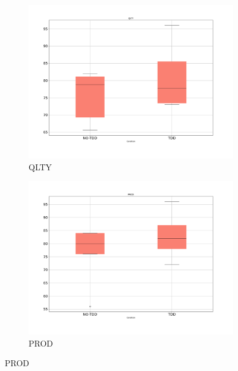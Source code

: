 \begin{figure}[htbp]
    \centering
    \begin{subfigure}{0.5\textwidth}
        \includegraphics[width=\linewidth]{figures/box_plots/task1/QLTY.png}
        \caption{QLTY}
        \label{bp_task1_qlty}
    \end{subfigure}\hfil
    \begin{subfigure}{0.5\textwidth}
        \includegraphics[width=\linewidth]{figures/box_plots/task1/PROD.png}
        \caption{PROD}
        \label{bp_task1_prod}
    \end{subfigure}

    \medskip


\end{figure}
